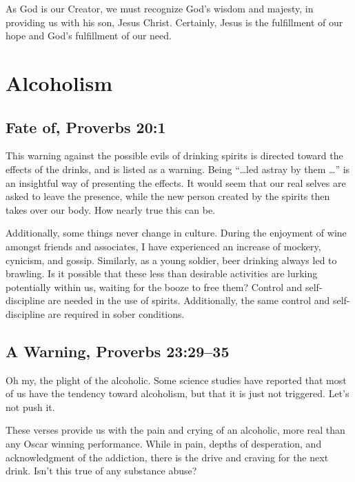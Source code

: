\documentclass[12pt]{memoir}
\begin{document}
As God is our Creator, we must recognize God's wisdom and majesty, in providing us with his son, Jesus Christ. Certainly, Jesus is the
fulfillment of our hope and God's fulfillment of our need.

\section{Alcoholism}

\subsection[Fate of]{Fate of, Proverbs 20:1}

This warning against the possible evils of drinking spirits is directed toward the effects of the drinks, and is listed as a warning.
Being ``\dots led astray by them \dots'' is an insightful way of presenting the effects.
It would seem that our real selves are asked to leave the presence, while the new person created by the spirits then takes over our body. How nearly true this can be.

Additionally, some things never change in culture.
During the enjoyment of wine amongst friends and associates, I have experienced an increase of mockery, cynicism, and gossip.
Similarly, as a young soldier, beer drinking always led to brawling.
Is it possible that these less than desirable activities are lurking potentially within us, waiting for the booze to free them?
Control and self-discipline are needed in the use of spirits.
Additionally, the same control and self-discipline are required in sober conditions.

\subsection[A Warning]{A Warning, Proverbs 23:29--35}

Oh my, the plight of the alcoholic. Some science studies have reported that most of us have the tendency toward alcoholism, but that it is just not triggered. Let's not push it.

These verses provide us with the pain and crying of an alcoholic, more real than any Oscar winning performance. While in pain, depths of desperation, and acknowledgment of the addiction, there is the drive and craving for the next drink. Isn't this true of any substance abuse?
\end{document}
